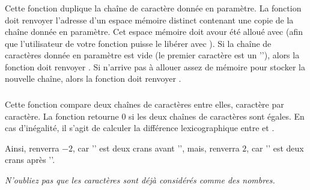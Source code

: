 \subsubsection*{}

\noindent Cette fonction duplique la chaîne de caractère donnée en paramètre.
La fonction doit renvoyer l'adresse d'un espace mémoire distinct contenant une copie de la chaîne donnée en paramètre.
Cet espace mémoire doit avour été alloué avec  (afin que l'utilisateur de votre fonction puisse le libérer avec ).
Si la chaîne de caractères donnée en paramètre est vide (le premier caractère est un ''), alors la fonction doit renvoyer .
Si  n'arrive pas à allouer assez de mémoire pour stocker la nouvelle chaîne, alors la fonction doit renvoyer .


\subsubsection*{}

\noindent Cette fonction compare deux chaînes de caractères entre elles, caractère par caractère.
La fonction retourne $ 0 $ si les deux chaînes de caractères sont égales.
En cas d'inégalité, il s'agit de calculer la différence lexicographique entre  et .

\noindent Ainsi,  renverra $ -2 $, car '' est deux crans avant '', mais,   renverra $ 2 $, car '' est deux crans après ''.

\noindent \textit{N'oubliez pas que les caractères sont déjà considérés comme des nombres.}

